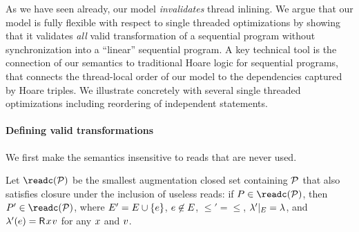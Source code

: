 

As we have seen already, our model {\em invalidates} thread inlining.  We argue that our model is fully flexible with respect to single threaded optimizations by showing that it validates {\em all} valid transformation of a sequential program without synchronization into a ``linear'' sequential program.   A key technical tool is the connection of our semantics to traditional Hoare logic for sequential programs, that connects the thread-local order of our model to the dependencies captured by Hoare triples.  We illustrate  concretely with several 
single threaded optimizations including reordering of independent statements.  

\paragraph*{Defining valid transformations}
We first make the semantics insensitive to
reads that are never used.


Let $\readc(\aPSS)$ be the smallest augmentation
closed set containing $\mathcal{P}$ that also satisfies closure under the inclusion
of useless reads: if $\aPS \in \readc(\aPSS)$, then
$\aPS' \in \readc(\aPSS)$, where $E'= E\cup\{e\}$,
$e \not \in E$, ${\le'} ={\le}$,
${\lambda'} \mathbin{|}_{E} = {\lambda}$, and
$\labeling'(\aEv) = \DR{\aLoc}{\aVal}$ for any $x$ and $v$.




